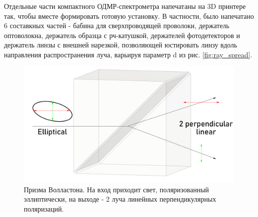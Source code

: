 \documentclass[10pt]{article}
\begin{document}
Отдельные части компактного ОДМР-спектрометра напечатаны на 3D принтере так, чтобы вместе формировать готовую установку. В частности, было напечатано 6 составкных частей - бабина для сверхпроводящей проволоки, держатель оптоволокна, держатель образца с рч-катушкой, держателей фотодетекторов и держатель линзы с внешней нарезкой, позволяющей юстировать линзу вдоль направления распространения луча, варьируя параметр d из рис. \ref{fig:ray_spread}. 

\begin{figure}[h!]
	\centering
	\includegraphics[scale = 0.18]{wollaston.png}
	\caption{Призма Волластона. На вход приходит свет, поляризованный эллиптически, на выходе - 2 луча линейных перпендикулярных поляризаций.}
	\label{fig:wollaston}
\end{figure}

\newpage

\begin{thebibliography}{}
	
\end{thebibliography}
\end{document}
